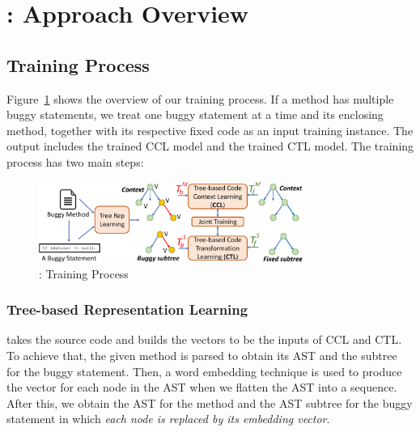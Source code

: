 \section{{\tool}: Approach Overview}
\label{overview:sec}



\subsection{Training Process}

Figure~\ref{overview-training} shows the overview of our training
process. If a method has multiple buggy statements, we treat one buggy
statement at a time and its enclosing method, together with its
respective fixed code as an input training instance.
The output includes the trained CCL model and the trained CTL model.
The training process has two main steps:

\begin{figure}[t]
	\centering
	\includegraphics[width=3.4in]{graphs/new_overview-4.png}
	\caption{{\tool}: Training Process}
	\label{overview-training}
\end{figure}


\subsubsection{Tree-based Representation Learning}

{\tool} takes the source code and builds the vectors to be the inputs
of CCL and CTL. To achieve that, the given method is parsed to obtain
its AST and the subtree for the buggy statement.  Then, a word
embedding technique is used to produce the vector for each node in the
AST when we flatten the AST into a sequence. After this, we obtain the
AST for the method and the AST subtree for the buggy statement in
which {\em each node is replaced by its embedding vector}.

